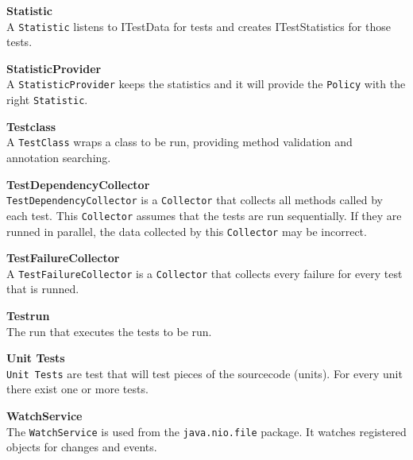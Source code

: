 \documentclass[i2]{oss}
\newcommand{\class}[1]{\texttt{#1}}
\newcommand{\gloss}[1]{\textbf{#1}}
\begin{document}
\begin{description}
\item \gloss{Statistic} \\
A \class{Statistic} listens to ITestData for tests and creates ITestStatistics for those tests.

\item \gloss{StatisticProvider} \\
A \class{StatisticProvider} keeps the statistics and it will provide the \class{Policy} with the right \class{Statistic}.

\item \gloss{Testclass} \\
 A \class{TestClass} wraps a class to be run, providing method validation and annotation searching.

\item \gloss{TestDependencyCollector} \\
\class{TestDependencyCollector} is a \class{Collector} that collects all methods called by each test. This \class{Collector} assumes that the tests are run sequentially. If they are runned in parallel, the data collected by this \class{Collector} may be incorrect.

\item \gloss{TestFailureCollector} \\
A \class{TestFailureCollector} is a \class{Collector} that collects every failure for every test that is runned.


\item \gloss{Testrun} \\ 
	The run that executes the tests to be run.


\item \gloss{Unit Tests} \\
\class{Unit Tests} are test that will test pieces of the sourcecode (units). For every unit there exist one or more tests. 

\item \gloss{WatchService} \\
The \class{WatchService} is used from the \class{java.nio.file} package. It watches registered objects for changes and events.

\end{description}

\newpage
\end{document}
